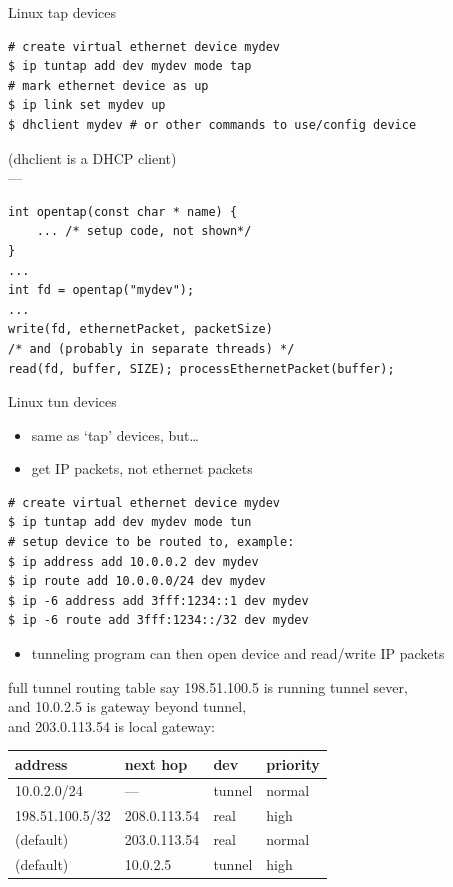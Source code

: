 \begin{frame}[fragile]{Linux tap devices}
\begin{Verbatim}[fontsize=\fontsize{10}{11}]
# create virtual ethernet device mydev
$ ip tuntap add dev mydev mode tap
# mark ethernet device as up
$ ip link set mydev up
$ dhclient mydev # or other commands to use/config device
\end{Verbatim}
(dhclient is a DHCP client) \\
---
\begin{Verbatim}[fontsize=\fontsize{10}{11}]
int opentap(const char * name) {
    ... /* setup code, not shown*/
}
...
int fd = opentap("mydev");
...
write(fd, ethernetPacket, packetSize)
/* and (probably in separate threads) */
read(fd, buffer, SIZE); processEthernetPacket(buffer);
\end{Verbatim}
\end{frame}


\begin{frame}[fragile]{Linux tun devices}
    \begin{itemize}
    \item same as `tap' devices, but\ldots
    \item get IP packets, not ethernet packets
    \end{itemize}
\begin{Verbatim}[fontsize=\fontsize{10}{11}]
# create virtual ethernet device mydev
$ ip tuntap add dev mydev mode tun
# setup device to be routed to, example:
$ ip address add 10.0.0.2 dev mydev
$ ip route add 10.0.0.0/24 dev mydev
$ ip -6 address add 3fff:1234::1 dev mydev
$ ip -6 route add 3fff:1234::/32 dev mydev
\end{Verbatim}
    \begin{itemize}
    \item tunneling program can then open device and read/write IP packets
    \end{itemize}
\end{frame}

\begin{frame}[fragile]{full tunnel routing table}
say 198.51.100.5 is running tunnel sever, \\
and 10.0.2.5  is gateway beyond tunnel, \\
and 203.0.113.54 is local gateway: \\
\begin{tabular}{l|l|l|l}
address & next hop & dev & priority\\ \hline
10.0.2.0/24 & --- & tunnel & normal \\
198.51.100.5/32 & 208.0.113.54 & real & high\\
(default) & 203.0.113.54 & real & normal \\
(default) & 10.0.2.5 & tunnel & high \\
\end{tabular}
\end{frame}


